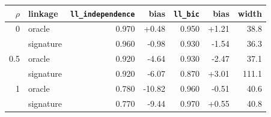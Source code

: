 \begin{tabular}{rlrrrrr}
\toprule
$\rho$ & linkage & \texttt{ll\_independence} & bias & \texttt{ll\_bic} & bias & width \\
\midrule
0 & oracle & 0.970 & +0.48 & 0.950 & +1.21 & 38.8 \\
 & signature & 0.960 & -0.98 & 0.930 & -1.54 & 36.3 \\
0.5 & oracle & 0.920 & -4.64 & 0.930 & -2.47 & 37.1 \\
 & signature & 0.920 & -6.07 & 0.870 & +3.01 & 111.1 \\
1 & oracle & 0.780 & -10.82 & 0.960 & -0.51 & 40.6 \\
 & signature & 0.770 & -9.44 & 0.970 & +0.55 & 40.8 \\
\bottomrule
\end{tabular}
\par{}
